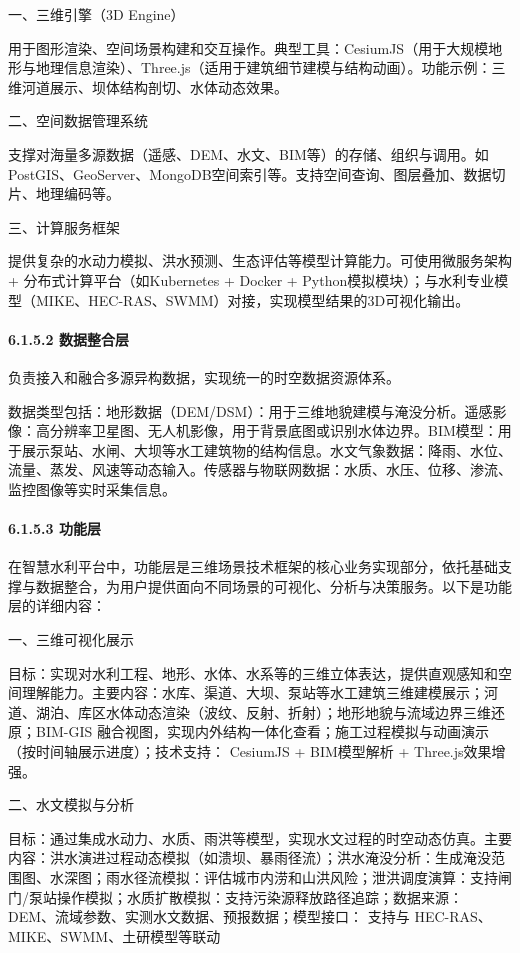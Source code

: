 一、三维引擎（3D Engine）

用于图形渲染、空间场景构建和交互操作。典型工具：CesiumJS（用于大规模地形与地理信息渲染）、Three.js（适用于建筑细节建模与结构动画）。功能示例：三维河道展示、坝体结构剖切、水体动态效果。

二、空间数据管理系统

支撑对海量多源数据（遥感、DEM、水文、BIM等）的存储、组织与调用。如PostGIS、GeoServer、MongoDB空间索引等。支持空间查询、图层叠加、数据切片、地理编码等。

三、计算服务框架

提供复杂的水动力模拟、洪水预测、生态评估等模型计算能力。可使用微服务架构 + 分布式计算平台（如Kubernetes + Docker + Python模拟模块）；与水利专业模型（MIKE、HEC-RAS、SWMM）对接，实现模型结果的3D可视化输出。

\paragraph{6.1.5.2 数据整合层}\label{ux6570ux636eux6574ux5408ux5c42}

负责接入和融合多源异构数据，实现统一的时空数据资源体系。

数据类型包括：地形数据（DEM/DSM）：用于三维地貌建模与淹没分析。遥感影像：高分辨率卫星图、无人机影像，用于背景底图或识别水体边界。BIM模型：用于展示泵站、水闸、大坝等水工建筑物的结构信息。水文气象数据：降雨、水位、流量、蒸发、风速等动态输入。传感器与物联网数据：水质、水压、位移、渗流、监控图像等实时采集信息。

\paragraph{6.1.5.3 功能层}\label{ux529fux80fdux5c42}

在智慧水利平台中，功能层是三维场景技术框架的核心业务实现部分，依托基础支撑与数据整合，为用户提供面向不同场景的可视化、分析与决策服务。以下是功能层的详细内容：

一、三维可视化展示

目标：实现对水利工程、地形、水体、水系等的三维立体表达，提供直观感知和空间理解能力。主要内容：水库、渠道、大坝、泵站等水工建筑三维建模展示；河道、湖泊、库区水体动态渲染（波纹、反射、折射）；地形地貌与流域边界三维还原；BIM-GIS 融合视图，实现内外结构一体化查看；施工过程模拟与动画演示（按时间轴展示进度）；技术支持： CesiumJS + BIM模型解析 + Three.js效果增强。

二、水文模拟与分析

目标：通过集成水动力、水质、雨洪等模型，实现水文过程的时空动态仿真。主要内容：洪水演进过程动态模拟（如溃坝、暴雨径流）；洪水淹没分析：生成淹没范围图、水深图；雨水径流模拟：评估城市内涝和山洪风险；泄洪调度演算：支持闸门/泵站操作模拟；水质扩散模拟：支持污染源释放路径追踪；数据来源： DEM、流域参数、实测水文数据、预报数据；模型接口： 支持与 HEC-RAS、MIKE、SWMM、土研模型等联动

